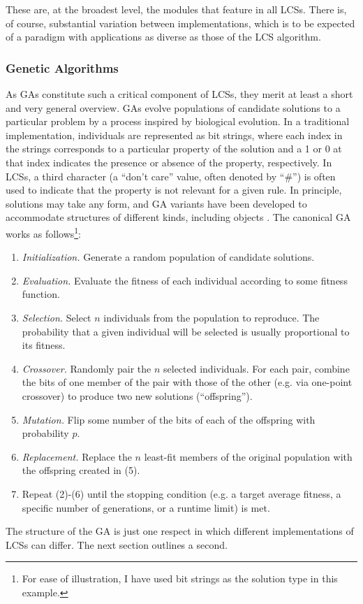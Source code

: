 \documentclass[11pt]{article}
\begin{document}
These are, at the broadest level, the modules that feature in all LCSs. There is, of course, substantial variation between implementations, which is to be expected of a paradigm with applications as diverse as those of the LCS algorithm.

\subsubsection{Genetic Algorithms}

As GAs constitute such a critical component of LCSs, they merit at least a short and very general overview. GAs evolve populations of candidate solutions to a particular problem by a process inspired by biological evolution. In a traditional implementation, individuals are represented as bit strings, where each index in the strings corresponds to a particular property of the solution and a 1 or 0 at that index indicates the presence or absence of the property, respectively. In LCSs, a third character (a ``don't care'' value, often denoted by ``\#'') is often used to indicate that the property is not relevant for a given rule. In principle, solutions may take any form, and GA variants have been developed to accommodate structures of different kinds, including objects \cite{keijzer_evolving_2001}. The canonical GA works as follows\footnote{For ease of illustration, I have used bit strings as the solution type in this example.}:
\begin{enumerate}
\item \emph{Initialization.} Generate a random population of candidate solutions.
\item \emph{Evaluation.} Evaluate the fitness of each individual according to some fitness function.
\item \emph{Selection.} Select $n$ individuals from the population to reproduce. The probability that a given individual will be selected is usually proportional to its fitness.
\item \emph{Crossover.} Randomly pair the $n$ selected individuals. For each pair, combine the bits of one member of the pair with those of the other (e.g. via one-point crossover) to produce two new solutions (``offspring'').
\item \emph{Mutation.} Flip some number of the bits of each of the offspring with probability $p$.
\item \emph{Replacement.} Replace the $n$ least-fit members of the original population with the offspring created in (5).
\item Repeat (2)-(6) until the stopping condition (e.g. a target average fitness, a specific number of generations, or a runtime limit) is met.
\end{enumerate}
The structure of the GA is just one respect in which different implementations of LCSs can differ. The next section outlines a second.
\end{document}

